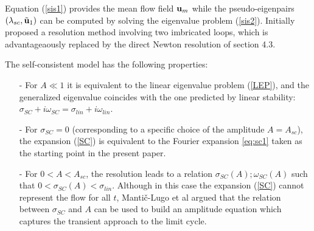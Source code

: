 \documentclass[twocolumn,10pt]{asme2ej}
\begin{document}
Equation (\ref{sis1}) provides the mean flow field ${\bf u }_m$ while the 
pseudo-eigenpairs $(\lambda_{sc},  \tilde{{\bf u }}_1)$ can be computed by solving the eigenvalue problem (\ref{sis2}).
\cite{MLugo2014} Initially proposed a resolution method involving two imbricated loops, which is advantageaously replaced by
the direct Newton resolution of section 4.3. 


The self-consistent model has the following properties:
\begin{itemize}
\item[-] For $ A \ll 1$ it is equivalent to the linear eigenvalue problem (\ref{LEP}), and the generalized eigenvalue coincides with the one predicted by linear stability: $\sigma_{SC} + i \omega_{SC} = \sigma_{lin} + i \omega_{lin}$.
\item[-] For $\sigma_{SC}=0$ (corresponding to a specific choice of the amplitude $A=A_{sc}$),  the expansion (\ref{SC}) is equivalent to 
the Fourier expansion \ref{eq:sc1} taken as the starting point in the present paper. 
\item[-] For $0<A<A_{sc}$, the resolution leads to a relation $\sigma_{SC}(A) ; \omega_{SC}(A)$
such that $0< \sigma_{SC}(A) < \sigma_{lin}$.
 Although in this case the expansion ({\ref{SC}}) cannot represent the flow for all $t$, Manti\v{c}-Lugo et al \cite{MLugo2014} argued that the relation between $\sigma_{SC}$ and $A$ can be used to build an amplitude equation which captures the transient approach to the limit cycle. 
\end{itemize}

\end{document}
